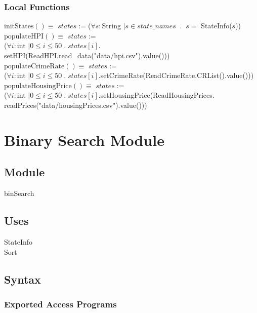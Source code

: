 \documentclass[12pt]{article}
\begin{document}
\subsubsection* {Local Functions}

\noindent
$\text{initStates}() \equiv$ $states := $($\forall s: $String $| s \in state\_names \;\;.\;\; s = $ StateInfo($s$))\\

\noindent
$\text{populateHPI}() \equiv$ $states := $\\($\forall i: $int $| 0 \le i \le 50 \;.\; states[i].$setHPI(ReadHPI.read\_data("data/hpi.csv").value()))\\

\noindent
$\text{populateCrimeRate}() \equiv$ $states := $\\($\forall i: $int $| 0 \le i \le 50 \;.\; states[i].$setCrimeRate(ReadCrimeRate.CRList().value()))\\

\noindent
$\text{populateHousingPrice}() \equiv$ $states := $\\($\forall i: $int $| 0 \le i \le 50 \;.\; states[i].$setHousingPrice(ReadHousingPrices.\\readPrices("data/housingPrices.csv").value()))



\newpage

\section* {Binary Search Module}

\subsection* {Module}

binSearch

\subsection* {Uses}

StateInfo\\
Sort

\subsection* {Syntax}

\subsubsection* {Exported Access Programs}
\end{document}
